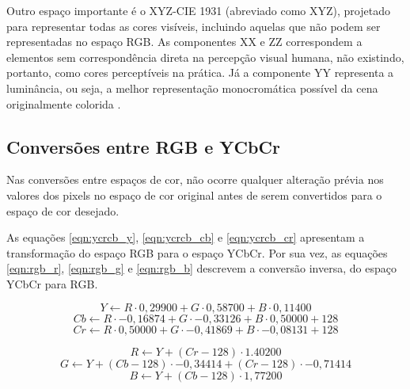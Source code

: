 Outro espaço importante é o XYZ-CIE 1931 (abreviado como XYZ), projetado para representar todas as cores visíveis, incluindo aquelas que não podem ser representadas no espaço RGB.
As componentes XX e ZZ correspondem a elementos sem correspondência direta na percepção visual humana, não existindo, portanto, como cores perceptíveis na prática.
Já a componente YY representa a luminância, ou seja, a melhor representação monocromática possível da cena originalmente colorida \cite{ohta}.

\subsection{Conversões entre RGB e YCbCr}

Nas conversões entre espaços de cor, não ocorre qualquer alteração prévia nos valores dos pixels no espaço de cor original antes de serem convertidos para o espaço de cor desejado.

As equações \ref{eqn:ycrcb_y}, \ref{eqn:ycrcb_cb} e \ref{eqn:ycrcb_cr} apresentam a transformação do espaço RGB para o espaço YCbCr.
Por sua vez, as equações \ref{eqn:rgb_r}, \ref{eqn:rgb_g} e \ref{eqn:rgb_b} descrevem a conversão inversa, do espaço YCbCr para RGB.

\begin{equation}
    \label{eqn:ycrcb_y}
    Y \xleftarrow{} R \cdot 0,29900 + G \cdot 0,58700 + B \cdot 0,11400
\end{equation}
\begin{equation}
    \label{eqn:ycrcb_cb}
    Cb \xleftarrow{} R \cdot -0,16874 + G \cdot -0,33126 + B \cdot 0,50000 + 128
\end{equation}
\begin{equation}
    \label{eqn:ycrcb_cr}
    Cr \xleftarrow{} R \cdot 0,50000 + G \cdot -0,41869 + B \cdot - 0,08131 + 128
\end{equation}

\begin{equation}
    \label{eqn:rgb_r}
    R \xleftarrow{} Y + (Cr - 128) \cdot 1.40200
\end{equation}
\begin{equation}
    \label{eqn:rgb_g}
    G \xleftarrow{} Y + (Cb - 128) \cdot -0,34414 + (Cr - 128) \cdot -0,71414
\end{equation}
\begin{equation}
    \label{eqn:rgb_b}
    B \xleftarrow{} Y + (Cb - 128) \cdot 1,77200
\end{equation}

